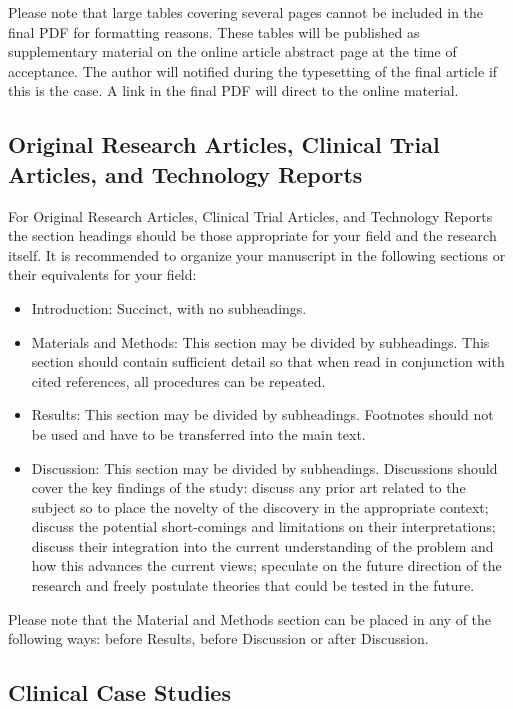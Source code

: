 \documentclass{frontiersSCNS} %
\begin{document}
Please note that large tables covering several pages cannot be included in the final PDF for formatting reasons. These tables will be published as supplementary material on the online article abstract page at the time of acceptance. The author will notified during the typesetting of the final article if this is the case. A link in the final PDF will direct to the online material.

\subsection{Original Research Articles, Clinical Trial Articles, and Technology Reports}

For Original Research Articles, Clinical Trial Articles, and Technology Reports the section headings should be those appropriate for your field and the research itself. It is recommended to organize your manuscript in the following sections or their equivalents for your field:

\begin{itemize}
\item Introduction: Succinct, with no subheadings.
\item Materials and Methods: This section may be divided by subheadings. This section should contain sufficient detail so that when read in conjunction with cited references, all procedures can be repeated.
\item Results: This section may be divided by subheadings. Footnotes should not be used and have to be transferred into the main text.
\item Discussion: This section may be divided by subheadings. Discussions should cover the key findings of the study: discuss any prior art related to the subject so to place the novelty of the discovery in the appropriate context; discuss the potential short-comings and limitations on their interpretations; discuss their integration into the current understanding of the problem and how this advances the current views; speculate on the future direction of the research and freely postulate theories that could be tested in the future.
\end{itemize}

Please note that the Material and Methods section can be placed in any of the following ways: before Results, before Discussion or after Discussion.

\subsection{Clinical Case Studies}
\end{document}
